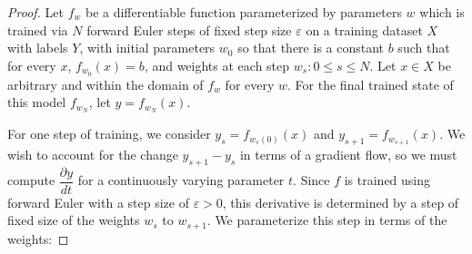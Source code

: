 \begin{proof}
\label{proof:eker}
Let $f_{w}$ be a differentiable function parameterized by parameters $w$ which is trained via $N$ forward Euler steps of fixed step size $\varepsilon$ on a training dataset $X$ with labels $ Y$, with initial parameters $w_0$ so that there is a constant $b$ such that for every $x$, $f_{w_0}(x) = b$, and weights at each step ${w_s : 0 \leq s \leq N}$. Let $x \in X$ be arbitrary and within the domain of $f_w$ for every $w$. For the final trained state of this model $f_{w_N}$, let $y = f_{w_N}(x)$. 

For one step of training, we consider $y_s  = f_{w_s(0)}(x)$ and $y_{s+1} = f_{w_{s+1}}(x)$. We wish to account for the change $y_{s+1} - y_s$ in terms of a gradient flow, so we must compute $\dfrac{\partial y}{dt}$ for a continuously varying parameter $t$. Since $f$ is trained using forward Euler with a step size of $\varepsilon > 0$, this derivative is determined by a step of fixed size of the weights $w_s$ to $w_{s+1}$. We parameterize this step in terms of the weights:


\end{proof}
